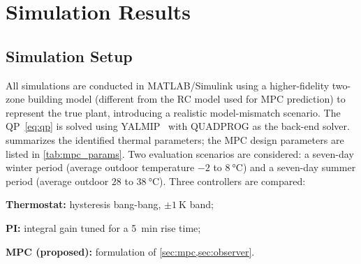 \documentclass[conference,a4paper]{IEEEtran}[2015/08/26]
\begin{document}
\section{Simulation Results}
\label{sec:results}

\subsection{Simulation Setup}

All simulations are conducted in MATLAB/Simulink using a higher-fidelity
two-zone building model (different from the RC model used for MPC
prediction) to represent the true plant, introducing a realistic
model-mismatch scenario. The QP~\eqref{eq:qp} is solved using
YALMIP~\cite{Lofberg2004} with QUADPROG as the back-end solver.
 summarizes the identified thermal parameters; the MPC
design parameters are listed in \cref{tab:mpc_params}. Two evaluation
scenarios are considered: a seven-day winter period (average outdoor
temperature $-2$ to $\SI{8}{\celsius}$) and a seven-day summer period
(average outdoor $28$ to $\SI{38}{\celsius}$). Three controllers are
compared:
\begin{compactitem}
  \item \textbf{Thermostat:} hysteresis bang-bang, $\pm\SI{1}{\kelvin}$ band;
  \item \textbf{PI:} integral gain tuned for a \SI{5}{\minute} rise time;
  \item \textbf{MPC (proposed):} formulation of \cref{sec:mpc,sec:observer}.
\end{compactitem}
\end{document}
